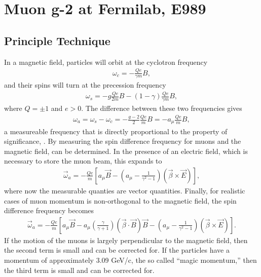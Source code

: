 \graphicspath{ {Body/Figures/ExperimentalOverview/Decay/} }

\chapter{Muon g-2 at Fermilab, E989}
\label{chapter:Muon g-2 at Fermilab, E989}
\thispagestyle{myheadings} %

\section{Principle Technique}
\label{sec:PrincipleTechnique}

In a magnetic field, particles will orbit at the cyclotron frequency 
        \begin{align} \label{eq:wc}
        	\omega_{c} = -\frac{Qe}{\gamma m}B,
        \end{align}
and their spins will turn at the precession frequency
        \begin{align} \label{eq:ws}
        	\omega_{s} = -g\frac{Qe}{2m}B - (1-\gamma)\frac{Qe}{\gamma m}B,
        \end{align}
where $Q = \pm 1$ and $e > 0$. The difference between these two frequencies gives
        \begin{align} \label{eq:wasimple}
        	\omega_{a} = \omega_{s} - \omega_{c} = -\frac{g-2}{2}\frac{Qe}{m}B = - a_{\mu} \frac{Qe}{m}B,
        \end{align}
a measureable frequency that is directly proportional to the property of significance, \amu. By measuring the spin difference frequency for muons and the magnetic field, \amu can be determined. In the presence of an electric field, which is necessary to store the muon beam, this expands to 
        \begin{align} \label{eq:waelectric}
            \vec{\omega}_{a} = -\frac{Qe}{m} [a_{\mu}\vec{B} - (a_{\mu} - \frac{1}{\gamma^{2}-1})(\vec{\beta} \times \vec{E}) ],
        \end{align}
where now the measurable quanties are vector quantities. Finally, for realistic cases of muon momentum is non-orthogonal to the magnetic field, the spin difference frequency becomes
        \begin{align} \label{eq:wafinal}
            \vec{\omega}_{a} = -\frac{Qe}{m} [a_{\mu}\vec{B} - a_{\mu} (\frac{\gamma}{\gamma+1})(\vec{\beta} \cdot \vec{B})\vec{B} - (a_{\mu} - \frac{1}{\gamma^{2}-1})(\vec{\beta} \times \vec{E}) ].
        \end{align}
If the motion of the muons is largely perpendicular to the magnetic field, then the second term is small and can be corrected for. If the particles have a momentum of approximately 3.09 GeV/c, the so called ``magic momentum,'' then the third term is small and can be corrected for. 

